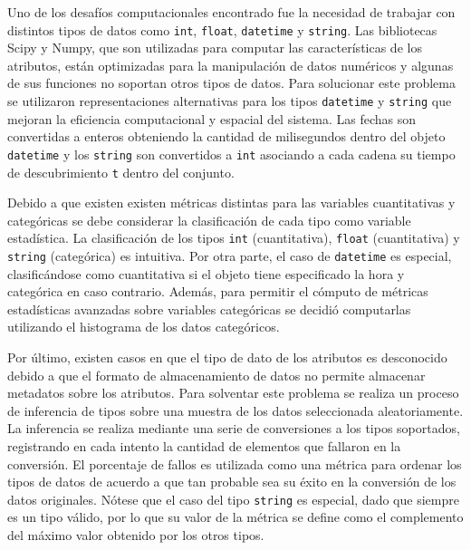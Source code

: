 Uno de los desaf\'ios computacionales encontrado fue la necesidad de trabajar con distintos
tipos de datos como \texttt{int}, \texttt{float}, \texttt{datetime} y \texttt{string}.
Las bibliotecas Scipy y Numpy, que son utilizadas para computar las caracter\'isticas
de los atributos,
est\'an optimizadas para la manipulaci\'on de datos num\'ericos y algunas
de sus funciones no soportan otros tipos de datos. Para solucionar este problema se utilizaron
representaciones alternativas para los tipos \texttt{datetime} y \texttt{string} que mejoran
la eficiencia computacional y espacial del sistema. Las fechas
son convertidas a enteros obteniendo la cantidad de milisegundos dentro del objeto \texttt{datetime} y los
\texttt{string} son convertidos a \texttt{int} asociando a cada cadena su tiempo de descubrimiento \texttt{t} dentro del conjunto.

Debido
a que existen existen m\'etricas distintas para las variables cuantitativas y categ\'oricas se debe considerar la clasificaci\'on
de cada tipo como variable estad\'istica. La clasificaci\'on
de los tipos \texttt{int} (cuantitativa), \texttt{float} (cuantitativa) y \texttt{string} (categ\'orica) es intuitiva. Por
otra parte, el caso de \texttt{datetime} es especial, clasific\'andose como cuantitativa si el objeto tiene
especificado la hora y categ\'orica en caso contrario. Adem\'as, para permitir el c\'omputo de m\'etricas estad\'isticas
avanzadas sobre variables categ\'oricas se decidi\'o computarlas utilizando el histograma de los datos categ\'oricos.

Por \'ultimo, existen casos en que el tipo de dato de los atributos es desconocido debido
a que el formato de almacenamiento de datos no permite almacenar metadatos sobre los atributos. Para solventar
este problema se realiza un proceso de inferencia de tipos sobre una muestra de los datos seleccionada aleatoriamente.
La inferencia se realiza mediante una serie de conversiones a los tipos soportados, registrando
en cada intento la cantidad de elementos que fallaron en la conversi\'on. El porcentaje de fallos es utilizada
como una m\'etrica para ordenar los tipos de datos de acuerdo a que tan probable sea su \'exito en la conversi\'on de los datos
originales. N\'otese que el caso del tipo \texttt{string} es especial, dado que siempre
es un tipo v\'alido, por lo que su valor de la m\'etrica se define como el complemento del m\'aximo valor obtenido por los otros tipos.

